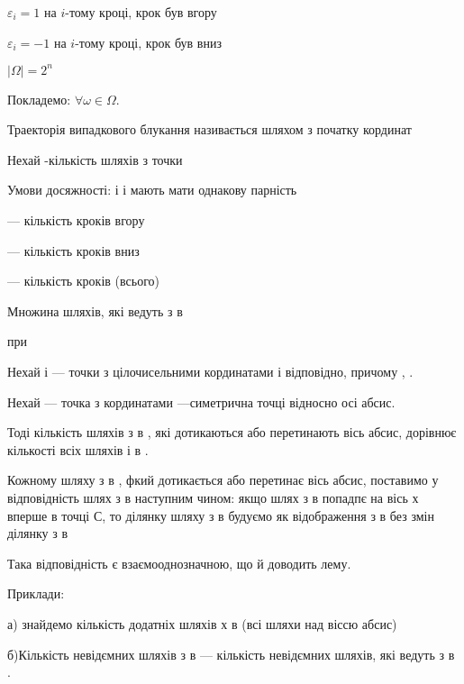 $\varepsilon_i = 1$ на  $i$-тому кроці, крок був вгору

$\varepsilon_i = -1$ на  $i$-тому кроці, крок був вниз

$|\Omega| = 2^n$

Покладемо: $\forall \omega \in \Omega$.

Траекторія випадкового блукання називається шляхом з початку
кординат

Нехай  -кількість шляхів з точки

Умови досяжності:  і  і  мають мати однакову парність

--- кількість кроків вгору

--- кількість кроків вниз

--- кількість кроків (всього)



Множина шляхів, які ведуть з  в

\begin{remark}
    при 
\end{remark}

\begin{lemma}
    Нехай  і --- точки з цілочисельними кординатами  і  відповідно,
    причому  , .
\end{lemma}

Нехай  --- точка з кординатами  ---симетрична точці  відносно
осі абсис.

Тоді кількість шляхів з  в , які дотикаються або перетинають вісь 
абсис, дорівнює кількості всіх шляхів і  в  .


Кожному шляху з  в  , фкий дотикається або перетинає вісь абсис,
поставимо у відповідність шлях з  в  наступним чином:
якщо шлях з  в  попадпє на вісь х вперше в точці С, то ділянку
шляху з  в  будуємо як відображення з  в  без змін ділянку з 
в

Така відповідність є взаємооднозначною, що й доводить лему.

Приклади:

а) знайдемо кількість додатніх шляхів х  в  (всі шляхи над
віссю абсис)

б)Кількість невідємних шляхів з  в  
--- кількість невідємних шляхів, які ведуть з  в  .

